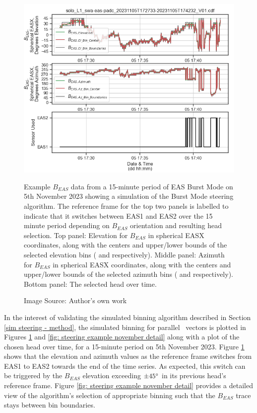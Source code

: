 \begin{figure}[h!]
    \centering
    \centerfloat
    \includegraphics[width=1.05\linewidth]{figures/Steering Example.png}
    \caption{Example \(B_{EAS}\) data from a 15-minute period of EAS Burst Mode on 5th November 2023 showing a simulation of the Burst Mode steering algorithm. The reference frame for the top two panels is labelled  to indicate that it switches between EAS1 and EAS2 over the 15 minute period depending on \(B_{EAS}\) orientation and resulting head selection. Top panel: Elevation for \(B_{EAS}\) in spherical EASX coordinates, along with the centers and upper/lower bounds of the selected elevation bins ( and  respectively). Middle panel: Azimuth for \(B_{EAS}\) in spherical EASX coordinates, along with the centers and upper/lower bounds of the selected azimuth bins ( and  respectively). Bottom panel: The selected head over time.}
    \caption*{Image Source: Author's own work}
    \label{fig: steering example november}
\end{figure}

In the interest of validating the simulated binning algorithm described in Section \ref{sim steering - method}, the simulated binning for parallel \Beas\ vectors is plotted in Figures \ref{fig: steering example november} and \ref{fig: steering example november detail} along with a plot of the chosen head over time, for a 15-minute period on 5th November 2023. Figure \ref{fig: steering example november} shows that the elevation and azimuth values  as the reference frame switches from EAS1 to EAS2 towards the end of the time series. As expected, this switch can be triggered by the \(B_{EAS}\) elevation exceeding \(\pm45\degree\) in its previous head's reference frame. Figure \ref{fig: steering example november detail} provides a detailed view of the algorithm's selection of appropriate binning such that the \(B_{EAS}\) trace stays between bin boundaries.
\\


